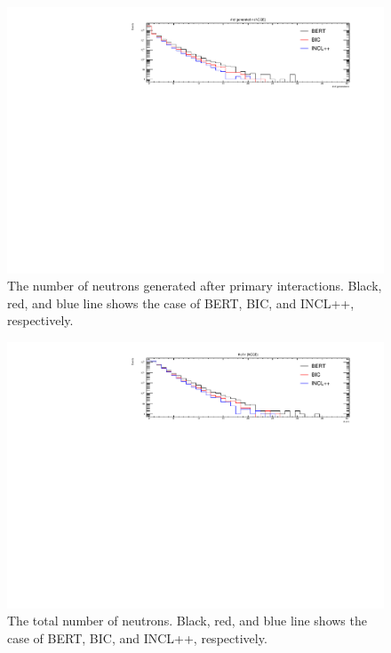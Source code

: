 \begin{figure}[p]
	\centering
	\includegraphics[width=16cm]{PDF/Secondary/Comparison/onlyNCQE_neutron/pdf1/Logy_NumSec}
	\caption[The number of neutrons generated after primary interactions]{
	The number of neutrons generated after primary interactions.
	Black, red, and blue line shows the case of BERT, BIC, and INCL++, respectively.
	}\label{neutron_Logy_NumSec}
\end{figure}

\begin{figure}[p]
	\centering
	\includegraphics[width=16cm]{PDF/Secondary/Comparison/onlyNCQE_neutron/pdf1/Logy_Num}
	\caption[The total number of neutrons]{
	The total number of neutrons.
	Black, red, and blue line shows the case of BERT, BIC, and INCL++, respectively.
	}\label{neutron_Logy_Num}
\end{figure}

